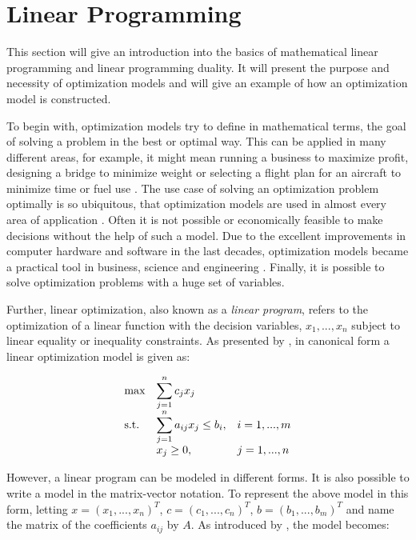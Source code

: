 \section{Linear Programming}
\label{sec:linear_progamming}
This section will give an introduction into the basics of mathematical linear programming
and linear programming duality.
It will present the purpose and necessity of optimization models and will give
an example of how an optimization model is constructed. 

To begin with, optimization models try to define in mathematical terms, the goal
of solving a problem in the best or optimal way. 
This can be applied in many different areas, for example, it might mean running a business to 
maximize profit, designing a bridge to minimize weight or selecting a flight plan for an aircraft
to minimize time or fuel use . 
The use case of solving an optimization problem optimally is so ubiquitous, 
that optimization models are used in almost every area of application .
Often it is not possible or economically feasible to make decisions without the help
of such a model. Due to the excellent improvements in computer hardware and software
in the last decades, optimization models became a practical tool 
in business, science and engineering . 
Finally, it is possible to solve optimization problems with a huge set of variables. 

Further, linear optimization, also known as a \textit{linear program}, refers to the optimization
of a linear function with the decision variables, $x_{1}, ..., x_{n}$ subject to 
linear equality or inequality constraints. 
As presented by , in canonical form 
a linear optimization model is given as:

\begin{equation*}
    \begin{array}{ll@{}ll}
        \text{max}  & \displaystyle\sum\limits_{j=1}^{n} c_{j}x_{j} &\\
        \text{s.t.}& \displaystyle\sum\limits_{j=1}^{n} a_{ij}x_{j} \leq b_{i},  &&i=1 ,..., m\\
                    &                        x_{j} \geq 0, &&j=1 ,..., n
    \end{array}
\end{equation*}

However, a linear program can be modeled in different forms. It is also possible 
to write a model in the matrix-vector notation. To represent the above model in this form, letting
$x=(x_{1}, ..., x_{n})^{T}$, $c=(c_{1}, ..., c_{n})^{T}$, $b=(b_{1}, ..., b_{m})^{T}$
and name the matrix of the coefficients $a_{ij}$ by $A$. As introduced by ,
the model becomes:

